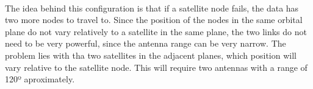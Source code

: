 \paragraph{}The idea behind this configuration is that if a satellite node fails, the data has two more nodes to travel to. Since the position of the nodes in the same orbital plane do not vary relatively to a satellite in the same plane, the two links do not need to be very powerful, since the antenna range can be very narrow. The problem lies with tha two satellites in the adjacent planes, which position will vary relative to the satellite node. This will require two antennas with a range of 120º aproximately.
